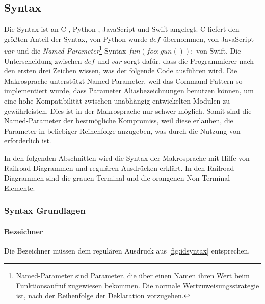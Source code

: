   \subsection{Syntax}
  \label{ssec:Syntax}
    Die Syntax ist an C \autocite{C-std}, Python \autocite{Python-std}, JavaScript \autocite{Ecma-std} und Swift \autocite{Swift-std} angelegt. C liefert den größten Anteil der Syntax, von Python wurde \myMIn$def$ übernommen, von JavaScript \myMIn$var$ und die \emph{Named-Parameter}\footnote{
      Named-Parameter sind Parameter, die über einen Namen ihren Wert beim Funktionsaufruf zugewiesen bekommen. Die normale Wertzuweisungsstrategie ist, nach der Reihenfolge der Deklaration vorzugehen.
    }
    Syntax \myMIn$fun(foo:gun());$ von Swift. Die Unterscheidung zwischen \myMIn$def$ und \myMIn$var$ sorgt dafür, dass die Programmierer nach den ersten drei Zeichen wissen, was der folgende Code ausführen wird. Die Makrosprache unterstützt Named-Parameter, weil das Command-Pattern so implementiert wurde, dass Parameter Aliasbezeichnungen benutzen können, um eine hohe Kompatibilität zwischen unabhängig entwickelten Modulen zu gewährleisten. Dies ist in der Makrosprache nur schwer möglich. Somit sind die Named-Parameter der bestmögliche Kompromiss, weil diese erlauben, die Parameter in beliebiger Reihenfolge anzugeben, was durch die Nutzung von  erforderlich ist.

    In den folgenden Abschnitten wird die Syntax der Makrosprache mit Hilfe von Railroad Diagrammen und regulären Ausdrücken erklärt. In den Railroad Diagrammen sind die grauen Terminal und die orangenen Non-Terminal Elemente.

    \subsubsection{Syntax Grundlagen}
    \label{sssec:Syntax Grundlagen}
      \paragraph{Bezeichner}
        Die Bezeichner müssen dem regulären Ausdruck aus \autoref{fig:idsyntax} entsprechen.

